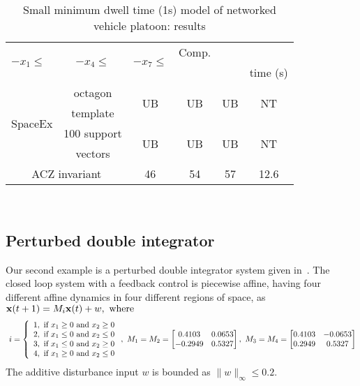 {\begin{table}
\begin{tabular}{|l|c|c|c|c|c|}
\multirow{2}{*}{$-x_1\leq$} & \multirow{2}{*}{$-x_4\leq$} & \multirow{2}{*}{$-x_7\leq$} & Comp.\\
\multicolumn{2}{|c|}{} & & & & time (s)\\
\hline
\multirow{4}{*}{SpaceEx} & octagon & \multirow{2}{*}{UB} &
\multirow{2}{*}{UB} & \multirow{2}{*}{UB} &
\multirow{2}{*}{NT}\\
& template & & & & \\
\cline{2-6}
& 100 support & \multirow{2}{*}{UB} & \multirow{2}{*}{UB} &
\multirow{2}{*}{UB} & \multirow{2}{*}{NT}\\
& vectors & & & & \\
\hline
\multicolumn{2}{|c|}{\multirow{2}{*}{ACZ invariant}} &
\multirow{2}{*}{46} & \multirow{2}{*}{54} &
\multirow{2}{*}{57} & \multirow{2}{*}{12.6}\\
\multicolumn{2}{|c|}{} & & & &\\
\hline
\end{tabular}
\caption{Small minimum dwell time (1s) model of networked vehicle
  platoon: results}
~\label{tab:smalldwell-platoon}
\end{table}
}
%
\subsection{Perturbed double integrator}
Our second example is a perturbed double integrator system given
in~\cite{rakovic2004computation}.  The closed loop system with a
feedback control is piecewise affine, having four different affine
dynamics in four different regions of space, as
${\bf x}(t+1)=M_i{\bf x}(t)+w,~\text{where}~$
{\scriptsize
\begin{align*}~\label{eqn:pwa-regions}
i=\left\{\begin{array}{l}
1,~\text{if}~x_1\geq 0~\text{and}~x_2\geq 0\\
2,~\text{if}~x_1\leq 0~\text{and}~x_2\leq 0\\
3,~\text{if}~x_1\leq 0~\text{and}~x_2\geq 0\\
4,~\text{if}~x_1\geq 0~\text{and}~x_2\leq 0\\
\end{array} \right.,
~M_1=M_2=\left[\begin{matrix}
0.4103  &  0.0653\\
   -0.2949  &  0.5327
\end{matrix}\right],~M_3=M_4=\left[\begin{matrix}
0.4103  &  -0.0653\\
   0.2949  &  0.5327
\end{matrix}\right]
\end{align*}}
%
The additive disturbance input $w$ is bounded as $\|w\|_{\infty}\leq
0.2$.  


